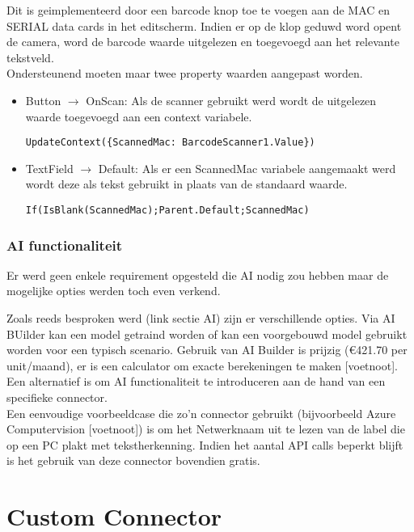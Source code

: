 Dit is geimplementeerd door een barcode knop toe te voegen aan de MAC en SERIAL data cards in het editscherm. Indien er op de klop geduwd word opent de camera, word de barcode waarde uitgelezen en toegevoegd aan het relevante tekstveld.\\
Ondersteunend moeten maar twee property waarden aangepast worden.
\begin{itemize}
    \item Button $\rightarrow$ OnScan: Als de scanner gebruikt werd wordt de uitgelezen waarde toegevoegd aan een context variabele.
\begin{lstlisting}
UpdateContext({ScannedMac: BarcodeScanner1.Value})
\end{lstlisting}
    \item TextField $\rightarrow$ Default: Als er een ScannedMac variabele aangemaakt werd wordt deze als tekst gebruikt in plaats van de standaard waarde.
\begin{lstlisting}
If(IsBlank(ScannedMac);Parent.Default;ScannedMac)
\end{lstlisting}    
\end{itemize}

\subsubsection{AI functionaliteit}

Er werd geen enkele requirement opgesteld die AI nodig zou hebben maar de mogelijke opties werden toch even verkend.

Zoals reeds besproken werd (link sectie AI) zijn er verschillende opties. Via AI BUilder kan een model getraind worden of kan een voorgebouwd model gebruikt worden voor een typisch scenario. Gebruik van AI Builder is prijzig (\euro 421.70 per unit/maand), er is een calculator om exacte berekeningen te maken [voetnoot]. Een alternatief is om AI functionaliteit te introduceren aan de hand van een specifieke connector.\\
Een eenvoudige voorbeeldcase die zo'n connector gebruikt (bijvoorbeeld Azure Computervision [voetnoot]) is om het Netwerknaam uit te lezen van de label die op een PC plakt met tekstherkenning. Indien het aantal API calls beperkt blijft is het gebruik van deze connector bovendien gratis.

\section{Custom Connector}


